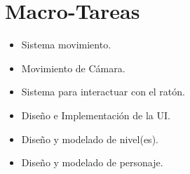 \documentclass[12pt,twoside,letterpaper]{article}
\begin{document}



\newpage


\section{Macro-Tareas}
\begin{itemize}
    \item Sistema movimiento.
    \item Movimiento de Cámara.
    \item Sistema para interactuar con el ratón.
    \item Diseño e Implementación de la UI.
    \item Diseño y modelado de nivel(es).
    \item Diseño y modelado de personaje.
\end{itemize}

\end{document}
